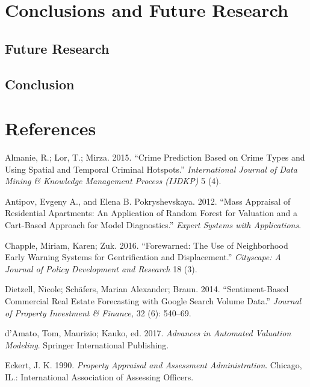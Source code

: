 \documentclass[]{article}
\begin{document}
\section{Conclusions and Future
Research}\label{conclusions-and-future-research}

\subsection{Future Research}\label{future-research}

\subsection{Conclusion}\label{conclusion}

\section*{References}\label{references}

\hypertarget{refs}{}
\hypertarget{ref-Almanie2015}{}
Almanie, R.; Lor, T.; Mirza. 2015. ``Crime Prediction Based on Crime
Types and Using Spatial and Temporal Criminal Hotspots.''
\emph{International Journal of Data Mining \& Knowledge Management
Process (IJDKP)} 5 (4).

\hypertarget{ref-antipov12}{}
Antipov, Evgeny A., and Elena B. Pokryshevskaya. 2012. ``Mass Appraisal
of Residential Apartments: An Application of Random Forest for Valuation
and a Cart-Based Approach for Model Diagnostics.'' \emph{Expert Systems
with Applications}.

\hypertarget{ref-Chapple2016}{}
Chapple, Miriam, Karen; Zuk. 2016. ``Forewarned: The Use of Neighborhood
Early Warning Systems for Gentrification and Displacement.''
\emph{Cityscape: A Journal of Policy Development and Research} 18 (3).

\hypertarget{ref-Dietzell2014}{}
Dietzell, Nicole; Schäfers, Marian Alexander; Braun. 2014.
``Sentiment-Based Commercial Real Estate Forecasting with Google Search
Volume Data.'' \emph{Journal of Property Investment \& Finance,} 32 (6):
540--69.

\hypertarget{ref-Springer2017}{}
d'Amato, Tom, Maurizio; Kauko, ed. 2017. \emph{Advances in Automated
Valuation Modeling}. Springer International Publishing.

\hypertarget{ref-Eckert1990}{}
Eckert, J. K. 1990. \emph{Property Appraisal and Assessment
Administration}. Chicago, IL.: International Association of Assessing
Officers.
\end{document}
